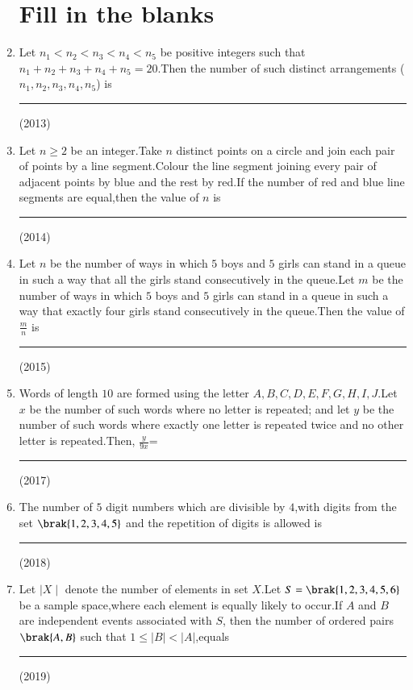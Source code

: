 \documentclass[journal,12pt,twocolumn]{IEEEtran}
\theoremstyle{remark}
\begin{document}
\begin{enumerate}
\section{Fill in the blanks}

    
\item Let $n_1<n_2<n_3<n_4<n_5$ be positive integers such that $n_1+n_2+n_3+n_4+n_5=20$.Then the number of such distinct arrangements ($n_1,n_2,n_3,n_4,n_5$) is \rule{1cm}{0.15mm}
\hfill(2013) \\

\item Let $n\ge2$ be an integer.Take $n$ distinct points on a circle and join each pair of points by a line segment.Colour the line segment joining every pair of adjacent points by blue and the rest by red.If the number of red and blue line segments are equal,then the value of $n$ is \rule{1cm}{0.15mm}
\hfill(2014)\\

\item Let $n$ be the number of ways in which $5$ boys and $5$ girls can stand in a queue in such a way that all the girls stand consecutively in the queue.Let $m$ be the number of ways in which $5$ boys and $5$ girls can stand in a queue in such a way that exactly four girls stand consecutively in the queue.Then the value of $\frac{m}{n}$ is \rule{1cm}{0.15mm}
\hfill(2015)\\

\item Words of length $10$ are formed using the letter $A,B,C,D,E,F,G,H,I,J$.Let $x$ be the number of such words where no letter is repeated; and let $y$ be the number of such words where exactly one letter is repeated twice and no other letter is repeated.Then, $\frac{y}{9x}$= \rule{1cm}{0.15mm} 
\hfill(2017)\\

\item The number of $5$ digit numbers which are divisible by $4$,with digits from the set $\brak{1,2,3,4,5}$ and the repetition of digits is allowed is \rule{1cm}{0.15mm}
\hfill (2018)\\

\item Let $\mid X \mid $ denote the number of elements in set $X$.Let $S=\brak{1,2,3,4,5,6}$ be a sample space,where each element is equally likely to occur.If $A$ and $B$ are independent events associated with $S$, then the number of ordered pairs $\brak{A,B}$ such that $1\leq|B|<|A|$,equals \rule{1cm}{0.15mm}
\hfill (2019)\\


\end{enumerate}
\end{document}
